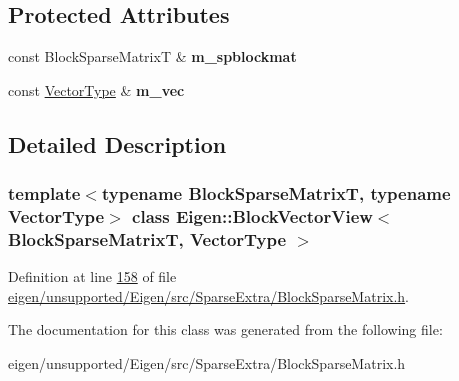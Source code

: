 \subsection*{Protected Attributes}
\begin{DoxyCompactItemize}
\item 
\mbox{\label{class_eigen_1_1_block_vector_view_a8a2d663cc762d16e43fed5e91371df18}} 
const Block\+Sparse\+MatrixT \& {\bfseries m\+\_\+spblockmat}
\item 
\mbox{\label{class_eigen_1_1_block_vector_view_a6253c62ef7ebb5b795944a93f6defd20}} 
const \hyperlink{struct_vector_type}{Vector\+Type} \& {\bfseries m\+\_\+vec}
\end{DoxyCompactItemize}


\subsection{Detailed Description}
\subsubsection*{template$<$typename Block\+Sparse\+MatrixT, typename Vector\+Type$>$\newline
class Eigen\+::\+Block\+Vector\+View$<$ Block\+Sparse\+Matrix\+T, Vector\+Type $>$}



Definition at line \hyperlink{eigen_2unsupported_2_eigen_2src_2_sparse_extra_2_block_sparse_matrix_8h_source_l00158}{158} of file \hyperlink{eigen_2unsupported_2_eigen_2src_2_sparse_extra_2_block_sparse_matrix_8h_source}{eigen/unsupported/\+Eigen/src/\+Sparse\+Extra/\+Block\+Sparse\+Matrix.\+h}.



The documentation for this class was generated from the following file\+:\begin{DoxyCompactItemize}
\item 
eigen/unsupported/\+Eigen/src/\+Sparse\+Extra/\+Block\+Sparse\+Matrix.\+h\end{DoxyCompactItemize}
